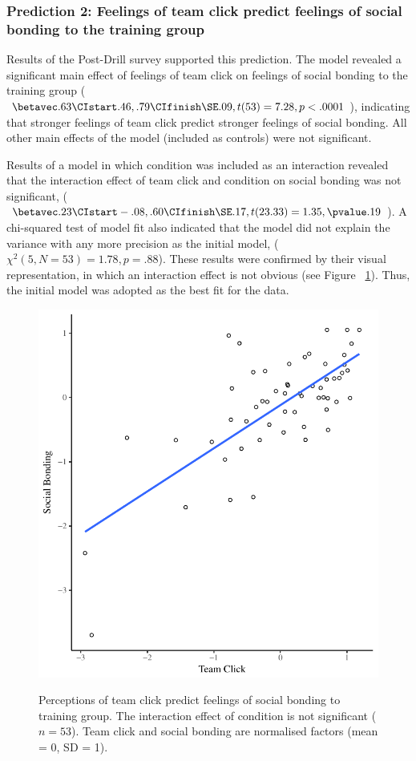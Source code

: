 




\subsubsection{Prediction 2: Feelings of team click predict feelings of social bonding to the training group}



Results of the Post-Drill survey supported this prediction. The model revealed a significant main effect of feelings of team click on feelings of social bonding to the training group ($\betavec .63 \CIstart .46, .79 \CIfinish \SE .09, t(53) = 7.28, p < .0001$), indicating that stronger feelings of team click predict stronger feelings of social bonding.  All other main effects of the model (included as controls) were not significant.

Results of a model in which condition was included as an interaction revealed that the interaction effect of team click and condition on social bonding was not significant, ($\betavec .23 \CIstart -.08, .60 \CIfinish \SE .17, t(23.33) = 1.35, \pvalue .19$).  A chi-squared test of model fit also indicated that the model did not explain the variance with any more precision as the initial model, ($\chi^2 (5, N = 53) = 1.78, p = .88$). These results were confirmed by their visual representation, in which an interaction effect is not obvious (see Figure ~\ref{fig:groupClickBondScatter}).  Thus, the initial model was adopted as the best fit for the data.


\begin{figure}
  \centering
    \includegraphics[width=0.5\linewidth,keepaspectratio] {images/groupClickBondScatter}
    \label{fig:groupClickBondScatter}
    \caption{Perceptions of team click predict feelings of social bonding to training group. The interaction effect of condition is not significant ($n = 53$).  Team click and social bonding are normalised factors (mean = 0, SD = 1).}
\end{figure}

